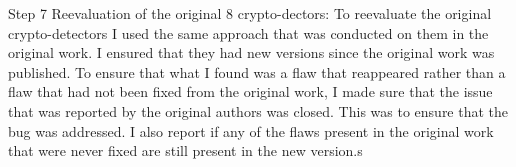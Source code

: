 Step 7 Reevaluation of the original 8 crypto-dectors: To reevaluate the original crypto-detectors I used the same approach that was conducted on them in the original work. I ensured that they had new versions since the original work was published. To ensure that what I found was a flaw that reappeared rather than a flaw that had not been fixed from the original work, I made sure that the issue that was reported by the original authors was closed. This was to ensure that the bug was addressed. I also report if any of the flaws present in the original work that were never fixed are still present in the new version.s